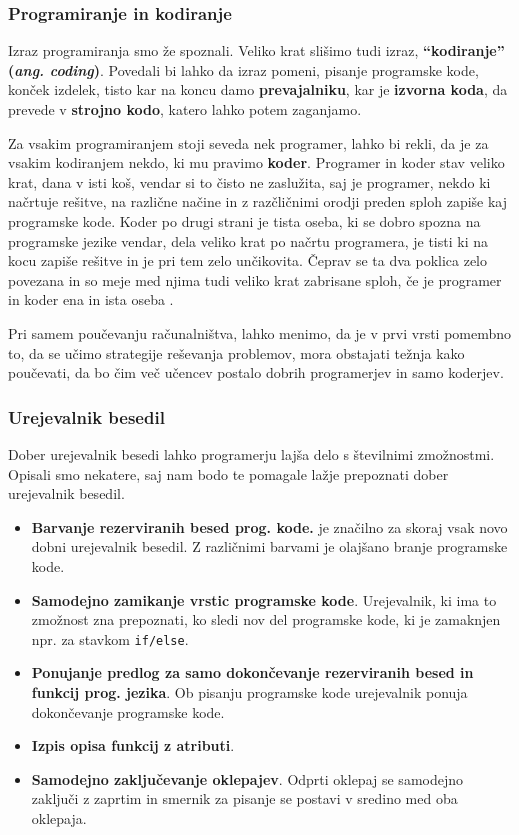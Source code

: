 \subsubsection{Programiranje in kodiranje}
\label{sec:programiranje_kodiranje}

Izraz programiranja smo že spoznali. Veliko krat slišimo tudi izraz,
\textbf{``kodiranje'' (\emph{ang. coding})}. Povedali bi lahko da
izraz pomeni, pisanje programske kode, konček izdelek, tisto kar na
koncu damo \textbf{prevajalniku}, kar je \textbf{izvorna koda}, da
prevede v \textbf{strojno kodo}, katero lahko potem zaganjamo.

Za vsakim programiranjem stoji seveda nek programer, lahko bi rekli,
da je za vsakim kodiranjem nekdo, ki mu pravimo
\textbf{koder}. Programer in koder stav veliko krat, dana v isti koš,
vendar si to čisto ne zaslužita, saj je programer, nekdo ki načrtuje
rešitve, na različne načine in z razčličnimi orodji preden sploh
zapiše kaj programske kode. Koder po drugi strani je tista oseba, ki
se dobro spozna na programske jezike vendar, dela veliko krat po
načrtu programera, je tisti ki na kocu zapiše rešitve in je pri tem
zelo unčikovita. Čeprav se ta dva poklica zelo povezana in so meje med
njima tudi veliko krat zabrisane sploh, če je programer in koder ena
in ista oseba \cite{web:coder}.

Pri samem poučevanju računalništva, lahko menimo, da je v prvi vrsti
pomembno to, da se učimo strategije reševanja problemov, mora
obstajati težnja kako poučevati, da bo čim več učencev postalo dobrih
programerjev in samo koderjev.

\subsubsection{Urejevalnik besedil}
\label{sec:urejevalnik_besedil}

Dober urejevalnik besedi lahko programerju lajša delo s številnimi
zmožnostmi. Opisali smo nekatere, saj nam bodo te pomagale lažje
prepoznati dober urejevalnik besedil.


\begin{itemize}
\item \textbf{Barvanje rezerviranih besed prog. kode.} je značilno za
  skoraj vsak novo dobni urejevalnik besedil. Z različnimi barvami je
  olajšano branje programske kode.
\item \textbf{Samodejno zamikanje vrstic programske
    kode}. Urejevalnik, ki ima to zmožnost zna prepoznati, ko sledi
  nov del programske kode, ki je zamaknjen npr. za stavkom
  \texttt{if/else}.
\item \textbf{Ponujanje predlog za samo dokončevanje rezerviranih
    besed in funkcij prog. jezika}. Ob pisanju programske kode
  urejevalnik ponuja dokončevanje programske kode.
\item \textbf{Izpis opisa funkcij z atributi}. 
\item \textbf{Samodejno zaključevanje oklepajev}. Odprti oklepaj se
  samodejno zaključi z zaprtim in smernik za pisanje se postavi v
  sredino med oba oklepaja. 
\end{itemize}

